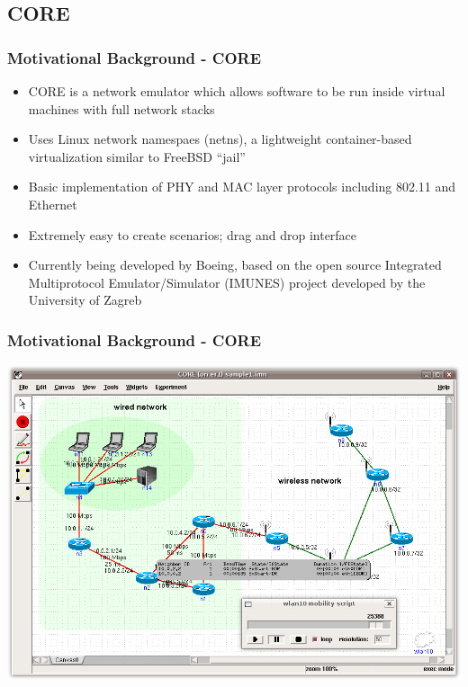 \documentclass[mathserif,usenames,dvipsnames]{beamer}
\begin{document}
\subsection{CORE}
\frame
{
    \frametitle{Motivational Background - CORE}
    \begin{itemize}
	\item CORE is a network emulator which allows software to be run inside virtual machines with full network stacks
	\item Uses Linux network namespaes (netns), a lightweight container-based virtualization similar to FreeBSD ``jail''
	\item Basic implementation of PHY and MAC layer protocols including 802.11 and Ethernet
	\item Extremely easy to create scenarios; drag and drop interface
	\item Currently being developed by Boeing, based on the open source Integrated Multiprotocol Emulator/Simulator (IMUNES) project developed by the University of Zagreb
    \end{itemize}
}

\frame
{
    \frametitle{Motivational Background - CORE}
    \begin{center}
        \includegraphics[scale=.25]{core-screenshot.png}
    \end{center}
}
\end{document}

